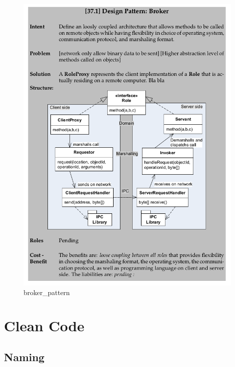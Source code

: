 \documentclass[11pt]{article}
\makeatletter
\def\maxwidth{\ifdim\Gin@nat@width>\linewidth\linewidth
    \else\Gin@nat@width\fi}
\let\Oldincludegraphics\includegraphics
\renewcommand{\includegraphics}[1]{\Oldincludegraphics[width=.8\maxwidth]{#1}}
\makeatother
\begin{document}
\begin{figure}
\centering
\includegraphics{img/broker_pattern.png}
\caption{broker\_pattern}
\end{figure}

    \hypertarget{clean-code}{%
\section{Clean Code}\label{clean-code}}

\hypertarget{naming}{%
\subsection{Naming}\label{naming}}
\end{document}
